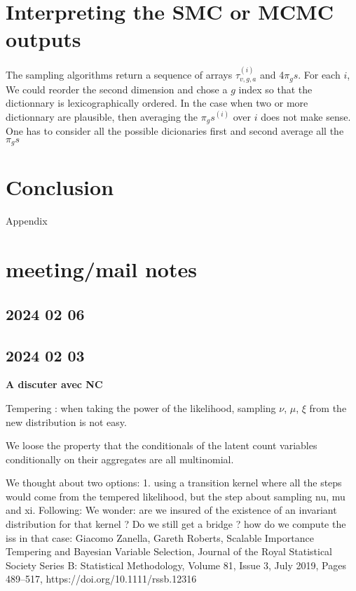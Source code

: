 \documentclass{article}
\begin{document}
\section{Interpreting the SMC or MCMC outputs}

The sampling algorithms return a sequence of arrays $\tau_{v,g,a}^{(i)}$ and 4$\pi_gs$.
For each $i$, We could reorder the second dimension and chose a $g$ index so that the dictionnary is lexicographically ordered. In the case when two or more  dictionnary are plausible, then averaging the $\pi_gs^{(i)}$ over $i$ does not make sense. One has to consider all the possible dicionaries first and second average all the $\pi_gs$



\section*{Conclusion}
%

\newpage
{\Huge Appendix}
\appendix



\section{meeting/mail notes}

\subsection{2024 02 06}



\subsection{2024 02 03}
{\bf A discuter avec NC}

Tempering : when taking the power of the likelihood, sampling $\nu$, $\mu$, $\xi$ from the new distribution is not easy.

We loose the property that the conditionals of the latent count variables conditionally on their aggregates are all multinomial.


We thought about two options: 
1. using a transition kernel where all the steps would come from the tempered likelihood, but the step about sampling nu, mu and xi.
Following:
We wonder: are we insured of the existence of an invariant distribution for that kernel ? Do we still get a bridge ? how do we compute the iss in that case:
Giacomo Zanella, Gareth Roberts, Scalable Importance Tempering and Bayesian Variable Selection, Journal of the Royal Statistical Society Series B: Statistical Methodology, Volume 81, Issue 3, July 2019, Pages 489–517, https://doi.org/10.1111/rssb.12316
\end{document}
